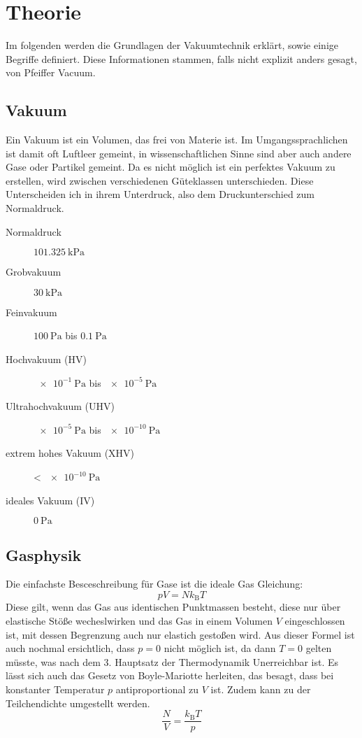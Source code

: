 \section{Theorie}
\label{sec:Theorie}
Im folgenden werden die Grundlagen der Vakuumtechnik erklärt, sowie einige Begriffe definiert. Diese Informationen stammen, falls nicht explizit anders gesagt, von Pfeiffer Vacuum\cite{Pfeiffer}.
\subsection{Vakuum}
Ein Vakuum ist ein Volumen, das frei von Materie ist. Im Umgangssprachlichen ist damit oft Luftleer gemeint, in wissenschaftlichen Sinne sind aber auch andere
Gase oder Partikel gemeint. Da es nicht möglich ist ein perfektes Vakuum zu erstellen, wird zwischen verschiedenen Güteklassen unterschieden. Diese
Unterscheiden ich in ihrem Unterdruck, also dem Druckunterschied zum Normaldruck.
\begin{description}
	\item[Normaldruck] $\SI{101.325}{\kilo \pascal}$
	\item[Grobvakuum] $\SI{30}{\kilo \pascal}$
	\item[Feinvakuum] $\SI{100}{\pascal}$ bis $\SI{0.1}{\pascal}$
	\item[Hochvakuum (HV)] $\SI{e-1}{\pascal}$ bis $\SI{e-5}{\pascal}$
	\item[Ultrahochvakuum (UHV)] $\SI{e-5}{\pascal}$ bis $\SI{e-10}{\pascal}$
	\item[extrem hohes Vakuum (XHV)] < $\SI{e-10}{\pascal}$
	\item[ideales Vakuum (IV)] $\SI{0}{\pascal}$
\end{description}
\subsection{Gasphysik}
Die einfachste Besceschreibung für Gase ist die ideale Gas Gleichung:
\begin{equation}
	pV=Nk_\text{B}T
\end{equation}
Diese gilt, wenn das Gas aus identischen Punktmassen besteht, diese nur über elastische Stöße wecheslwirken und das Gas in einem Volumen $V$ eingeschlossen
ist, mit dessen Begrenzung auch nur elastich gestoßen wird. Aus dieser Formel ist auch nochmal ersichtlich, dass $p=0$ nicht möglich ist, da dann $T=0$ gelten
müsste, was nach dem 3. Hauptsatz der Thermodynamik Unerreichbar ist. Es lässt sich auch das Gesetz von Boyle-Mariotte herleiten, das besagt, dass bei
 konstanter Temperatur $p$ antiproportional zu $V$ ist. Zudem kann zu der Teilchendichte umgestellt werden.
 \begin{equation}
 	\frac{N}{V}=\frac{k_\text{B}T}{p}
 \end{equation}
 \cite{TuSKierfeld}
